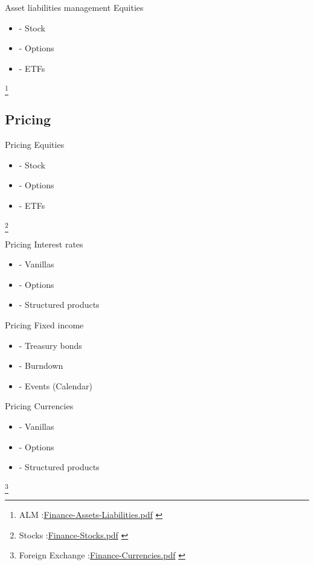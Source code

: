 \documentclass[8pt]{beamer}
\begin{document}
\begin{frame}{Asset liabilities management}
Equities
  \begin{itemize}
  \item
- Stock 
  \item
- Options 
  \item
- ETFs
  \end{itemize}
\footnote{
\tiny{ALM :\url{Finance-Assets-Liabilities.pdf} }
}
\end{frame}

\subsection{Pricing}

\begin{frame}{Pricing}
Equities
  \begin{itemize}
  \item
- Stock 
  \item
- Options 
  \item
- ETFs
  \end{itemize}
\footnote{
\tiny{Stocks :\url{Finance-Stocks.pdf} }
}
\end{frame}

\begin{frame}{Pricing}
Interest rates
  \begin{itemize}
  \item
- Vanillas 
  \item
- Options 
  \item
- Structured products 
  \end{itemize}
\end{frame}

\begin{frame}{Pricing}
Fixed income
 \begin{itemize}
  \item
- Treasury bonds 
  \item
- Burndown
  \item
- Events (Calendar)
  \end{itemize}
\end{frame}

\begin{frame}{Pricing}
Currencies
  \begin{itemize}
  \item
- Vanillas 
  \item
- Options 
  \item
- Structured products 
  \end{itemize}
\footnote{
\tiny{Foreign Exchange :\url{Finance-Currencies.pdf} }
}
\end{frame}
\end{document}
